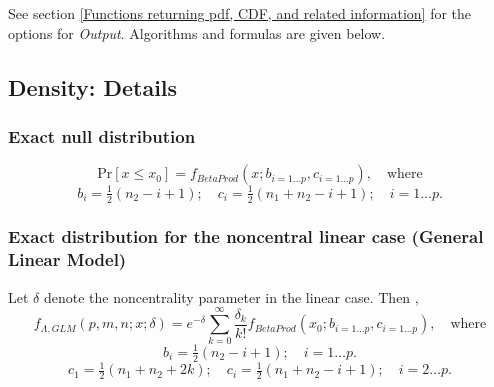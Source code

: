 \vspace{0.3cm}
See section \ref{Functions returning pdf, CDF, and related information} for the options for {\itshape\sffamily Output}. Algorithms and formulas are given below.



\subsection{Density: Details}


\subsubsection{Exact null distribution}
\label{WilksLambdaDistributionDensity}


\begin{equation}
	\text{Pr}[x \leq x_0] = f_{BetaProd}(x; b_{i=1\ldots p},c_{i=1\ldots p}), \quad \text{where}
\end{equation}
\begin{equation}
	b_i = \tfrac{1}{2} (n_2 -i+1); \quad c_i = \tfrac{1}{2} (n_1 + n_2 -i+1); \quad i=1 \ldots p.
\end{equation}



\subsubsection{Exact distribution for the noncentral linear case (General Linear Model)}
\label{WilksLambdaDistributionDensity_MANOVA}


Let $\delta$ denote the noncentrality parameter in the linear case. Then \citep{Tretter_1975}, \cite{Walster_1980}
\begin{equation}
	f_{\Lambda,GLM}(p,m,n;x;\delta) = e^{-\delta} \sum_{k=0}^{\infty} \frac{\delta_k}{k!} f_{BetaProd}(x_0; b_{i=1\ldots p},c_{i=1\ldots p}), \quad \text{where}
\end{equation}
\begin{equation}
	b_i = \tfrac{1}{2} (n_2 -i+1); \quad i=1 \ldots p.
\end{equation}
\begin{equation}
	c_1 = \tfrac{1}{2} (n_1 + n_2 +2k); \quad c_i = \tfrac{1}{2} (n_1 + n_2 -i+1); \quad i=2 \ldots p.
\end{equation}


